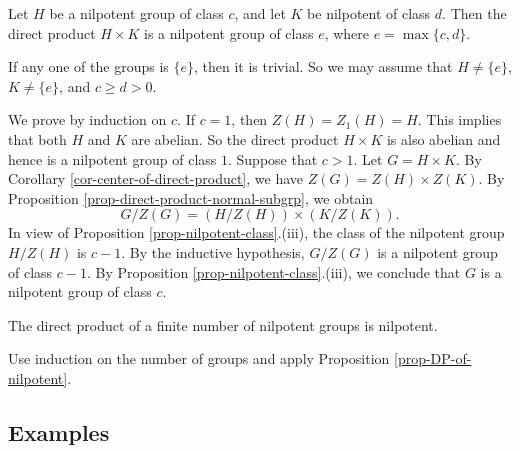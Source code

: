 \begin{proposition} \label{prop-DP-of-nilpotent}
	Let $H$ be a nilpotent group of class $c$, and let $K$ be nilpotent of class $d$. Then the direct product $H \times K$ is a nilpotent group of class $e$, where $e = \max\{c, d\}$.
\end{proposition}
\begin{sketch}
	If any one of the groups is $\{e\}$, then it is trivial. So
	we may assume that $H \neq \{e\}$, $K \neq \{e\}$, and $c \ge d > 0$. 
	
	We prove by induction on $c$. If $c=1$, then $Z(H) = Z_1(H) = H$. This implies that both $H$ and $K$ are abelian. So the direct product $H \times K$ is also abelian and hence  is a nilpotent group of class $1$.  Suppose that $c > 1$. Let $G = H \times K$. By Corollary \ref{cor-center-of-direct-product}, we have $Z(G) = Z(H) \times Z(K)$. By Proposition \ref{prop-direct-product-normal-subgrp}, we obtain 
	\begin{equation*}
		G/Z(G) = (H/Z(H)) \times (K/Z(K)).
	\end{equation*}
	In view of Proposition \ref{prop-nilpotent-class}.(iii), the class of the nilpotent group $H/Z(H)$ is $c-1$. By the inductive hypothesis, $G/Z(G)$ is a nilpotent group of class $c-1$. By Proposition \ref{prop-nilpotent-class}.(iii), we conclude that $G$ is a nilpotent group of class $c$.
\end{sketch}
\begin{corollary} \label{cor-direct-prod-nil-is-nil}
	The direct product of a finite number of nilpotent groups is nilpotent.
\end{corollary}
\begin{sketch}
	Use induction on the number of groups and apply Proposition \ref{prop-DP-of-nilpotent}.
\end{sketch}

\subsection{Examples}
